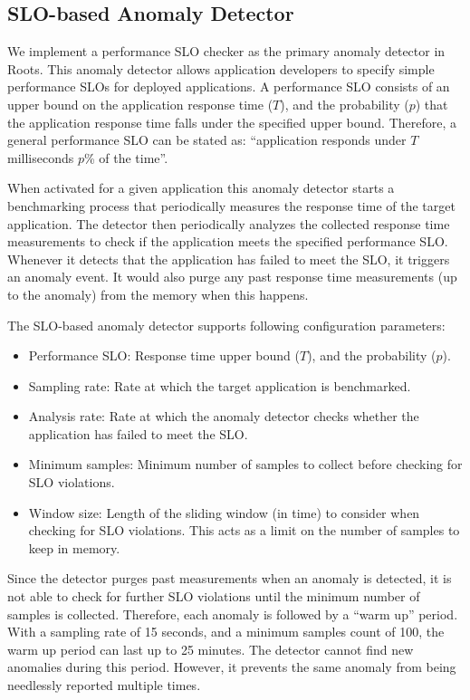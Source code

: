 \subsection{SLO-based Anomaly Detector}
We implement a performance SLO checker as the primary anomaly detector in Roots. This anomaly detector
allows application developers to specify simple performance SLOs for deployed applications. A
performance SLO consists of an upper bound on the application response time ($T$), and the probability ($p$)
that the application response time falls under the specified upper bound. Therefore, a general performance 
SLO can be stated as: ``application responds under $T$ milliseconds $p$\% of the time''.

When activated for a given application this anomaly detector starts a benchmarking process
that periodically measures the response time of the target application. The detector then periodically
analyzes the collected response time measurements to check if the application meets the specified performance
SLO. Whenever it detects that the application has failed to meet the SLO, it triggers an anomaly event. It would also
purge any past response time measurements (up to the anomaly) from the memory 
when this happens.

The SLO-based anomaly detector supports following configuration parameters:
\begin{itemize}
\item Performance SLO: Response time upper bound ($T$), and the probability ($p$).
\item Sampling rate: Rate at which the target application is benchmarked.
\item Analysis rate: Rate at which the anomaly detector checks whether the application has failed to meet the SLO.
\item Minimum samples: Minimum number of samples to collect before checking for SLO violations.
\item Window size: Length of the sliding window (in time) to consider when checking for SLO violations. This
acts as a limit on the number of samples to keep in memory.
\end{itemize}

Since the detector purges past measurements when an anomaly is detected, it is not able to
check for further SLO violations until the minimum number of samples is collected. Therefore,
each anomaly is followed by a ``warm up'' period. With a sampling rate of 15 seconds, and a minimum
samples count of 100, the warm up period can last up to 25 minutes. The detector cannot find new
anomalies during this period. However, it prevents the same anomaly from being needlessly
reported multiple times.

